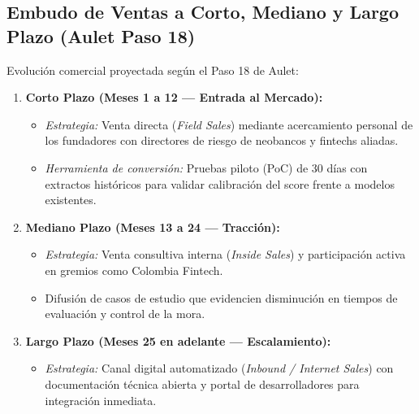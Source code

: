 \documentclass[11pt,a4paper]{article}
\begin{document}
\subsection{Embudo de Ventas a Corto, Mediano y Largo Plazo (Aulet Paso 18)}
Evoluci\'on comercial proyectada seg\'un el Paso 18 de Aulet:
\begin{enumerate}[leftmargin=*]
    \item \textbf{Corto Plazo (Meses 1 a 12 --- Entrada al Mercado):}
    \begin{itemize}
        \item \textit{Estrategia:} Venta directa (\textit{Field Sales}) mediante acercamiento personal de los fundadores con directores de riesgo de neobancos y fintechs aliadas.
        \item \textit{Herramienta de conversi\'on:} Pruebas piloto (PoC) de 30 d\'ias con extractos hist\'oricos para validar calibraci\'on del score frente a modelos existentes.
    \end{itemize}
    \item \textbf{Mediano Plazo (Meses 13 a 24 --- Tracci\'on):}
    \begin{itemize}
        \item \textit{Estrategia:} Venta consultiva interna (\textit{Inside Sales}) y participaci\'on activa en gremios como Colombia Fintech.
        \item Difusi\'on de casos de estudio que evidencien disminuci\'on en tiempos de evaluaci\'on y control de la mora.
    \end{itemize}
    \item \textbf{Largo Plazo (Meses 25 en adelante --- Escalamiento):}
    \begin{itemize}
        \item \textit{Estrategia:} Canal digital automatizado (\textit{Inbound / Internet Sales}) con documentaci\'on t\'ecnica abierta y portal de desarrolladores para integraci\'on inmediata.
    \end{itemize}
\end{enumerate}
\end{document}
